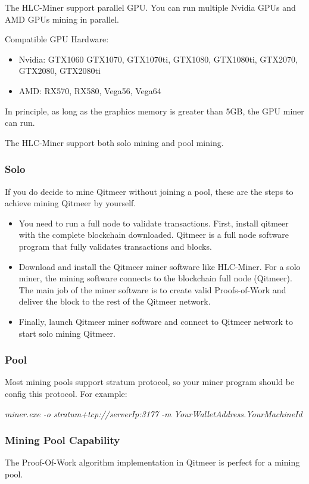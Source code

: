 \documentclass[a4paper,11pt]{article}
\begin{document}
The HLC-Miner support parallel GPU. You can run multiple Nvidia GPUs and AMD GPUs mining in parallel.

Compatible GPU Hardware:

\begin{itemize}
\item Nvidia: GTX1060 GTX1070, GTX1070ti, GTX1080, GTX1080ti, GTX2070, GTX2080, GTX2080ti
\item AMD: RX570, RX580, Vega56, Vega64
\end{itemize}

In principle, as long as the graphics memory is greater than 5GB, the GPU miner can run.

The HLC-Miner support both solo mining and pool mining. 

\subsubsection*{Solo}
If you do decide to mine Qitmeer without joining a pool, these are the steps to achieve mining Qitmeer by yourself.

\begin{itemize}
\item You need to run a full node to validate transactions. First, install qitmeer\cite{qitmeer} with the complete blockchain downloaded. Qitmeer is a full node software program that fully validates transactions and blocks. 
\item Download and install the Qitmeer miner software like HLC-Miner. For a solo miner, the mining software connects to the blockchain full node (Qitmeer). The main job of the miner software is to create valid Proofs-of-Work and deliver the block to the rest of the Qitmeer network.
\item Finally, launch Qitmeer miner software and connect to Qitmeer network to start solo mining Qitmeer.
\end{itemize}

\subsubsection*{Pool}
Most mining pools support stratum protocol, so your miner program should be config this protocol. 
For example:

\emph{miner.exe -o stratum+tcp://serverIp:3177 -m YourWalletAddress.YourMachineId}

\subsubsection{Mining Pool Capability}
The Proof-Of-Work algorithm implementation in Qitmeer is perfect for a mining pool.
\end{document}
